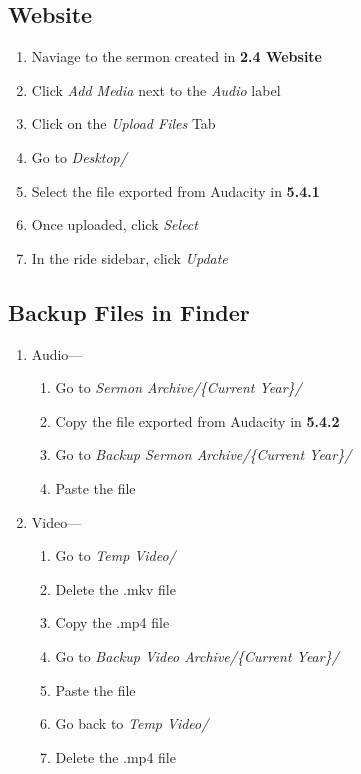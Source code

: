 \documentclass[12pt]{article}
\begin{document}
    \subsection{Website}
    \begin{enumerate}
        \item Naviage to the sermon created in \textbf{2.4 Website}
        \item Click \emph{Add Media} next to the \emph{Audio} label
        \item Click on the \emph{Upload Files} Tab
        \item Go to \emph{Desktop/}
        \item Select the file exported from Audacity in \textbf{5.4.1}
        \item Once uploaded, click \emph{Select}
        \item In the ride sidebar, click \emph{Update}
    \end{enumerate}

    \subsection{Backup Files in Finder}
    \begin{enumerate}
        \item Audio---
        \begin{enumerate}
            \item Go to \emph{Sermon Archive/\{Current Year\}/}
            \item Copy the file exported from Audacity in \textbf{5.4.2}
            \item Go to \emph{Backup Sermon Archive/\{Current Year\}/}
            \item Paste the file
        \end{enumerate}
        \item Video---
        \begin{enumerate}
            \item Go to \emph{Temp Video/}
            \item Delete the .mkv file
            \item Copy the .mp4 file
            \item Go to \emph{Backup Video Archive/\{Current Year\}/}
            \item Paste the file
            \item Go back to \emph{Temp Video/}
            \item Delete the .mp4 file
        \end{enumerate}
    \end{enumerate}
\end{document}
